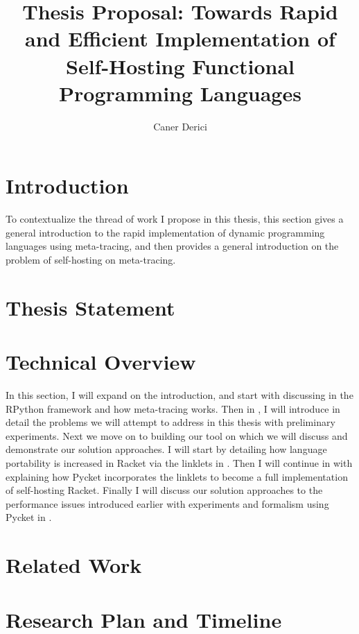 \documentclass[9pt]{extarticle}
\title{Thesis Proposal: Towards Rapid and Efficient Implementation
  of Self-Hosting Functional Programming Languages}
\author{Caner Derici}
\begin{document}


\maketitle

\begin{abstract}
\end{abstract}

\tableofcontents

\newpage

\section{Introduction}
\label{sec:intro}

To contextualize the thread of work I propose in this thesis, this
section gives a general introduction to the rapid implementation of
dynamic programming languages using meta-tracing, and then provides a
general introduction on the problem of self-hosting on meta-tracing.


\section{Thesis Statement}
\label{sec:thesis}


\section{Technical Overview}
\label{sec:technical}

In this section, I will expand on the introduction, and start with
discussing in  the RPython framework and how
meta-tracing works. Then in , I will
introduce in detail the problems we will attempt to address in this
thesis with preliminary experiments. Next we move on to building our
tool on which we will discuss and demonstrate our solution
approaches. I will start by detailing how language portability is
increased in Racket via the linklets in . Then
I will continue in  with explaining how Pycket
incorporates the linklets to become a full implementation of
self-hosting Racket. Finally I will discuss our solution approaches to
the performance issues introduced earlier with experiments and
formalism using Pycket in .


\section{Related Work}
\label{sec:related}


\section{Research Plan and Timeline}
\label{sec:timeline}


\printbibliography
\end{document}
